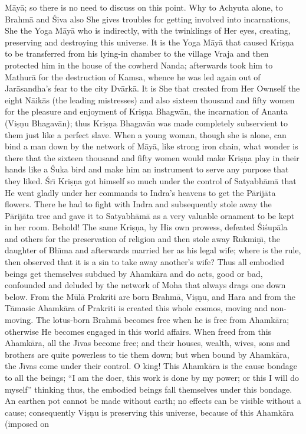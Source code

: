 M\=ay\=a; so there is no need to discuss on this point. Why to Achyuta alone, to Brahm\=a and \'Siva also She gives troubles for getting involved into incarnations, She the Yoga M\=ay\=a who is indirectly, with the twinklings of Her eyes, creating, preserving and destroying this universe. It is the Yoga M\=ay\=a that caused Kri\d{s}\d{n}a to be transferred from his lying-in chamber to the village Vraja and then protected him in the house of the cowherd Nanda; afterwards took him to Mathur\=a for the destruction of Kamsa, whence he was led again out of Jar\=asandha's fear to the city Dv\=ark\=a. It is She that created from Her Ownself the eight N\=aik\=as (the leading mistresses) and also sixteen thousand and fifty women for the pleasure and enjoyment of Kri\d{s}\d{n}a Bhagw\=an, the incarnation of Ananta (Vi\d{s}\d{n}u Bhagav\=an); thus Kri\d{s}\d{n}a Bhagav\=an was made completely subservient to them just like a perfect slave. When a young woman, though she is alone, can bind a man down by the network of M\=ay\=a, like strong iron chain, what wonder is there that the sixteen thousand and fifty women would make Kri\d{s}\d{n}a play in their hands like a \'Suka bird and make him an instrument to serve any purpose that they liked. \'Sr\={\i} Kri\d{s}\d{n}a got himself so much under the control of Satyabh\=am\=a that He went gladly under her commands to Indra's heavens to get the P\=arij\=ata flowers. There he had to fight with Indra and subsequently stole away the P\=arij\=ata tree and gave it to Satyabh\=am\=a as a very valuable ornament to be kept in her room. Behold! The same Kri\d{s}\d{n}a, by His own prowess, defeated \'Si\'sup\=ala and others for the preservation of religion and then stole away Rukmi\d{n}\={\i}, the daughter of Bh\={\i}ma and afterwards married her as his legal wife; where is the rule, then observed that it is a sin to take away another's wife? Thus all embodied beings get themselves subdued by Ahamk\=ara and do acts, good or bad, confounded and deluded by the network of Moha that always drags one down below. From the M\=ul\=a Prakriti are born Brahm\=a, Vi\d{s}\d{n}u, and Hara and from the T\=amasic Ahamk\=ara of Prakriti is created this whole cosmos, moving and non-moving. The lotus-born Brahm\=a becomes free when he is free from Ahamk\=ara; otherwise He becomes engaged in this world affairs. When freed from this Ahamk\=ara, all the J\={\i}vas become free; and their houses, wealth, wives, sons and brothers are quite powerless to tie them down; but when bound by Ahamk\=ara, the J\={\i}vas come under their control. O king! This Ahamk\=ara is the cause bondage to all the beings; ``I am the doer, this work is done by my power; or this I will do myself'' thinking thus, the embodied beings fall themselves under this bondage. An earthen pot cannot be made without earth; no effects can be visible without a cause; consequently Vi\d{s}\d{n}u is preserving this universe, because of this Ahamk\=ara (imposed on

